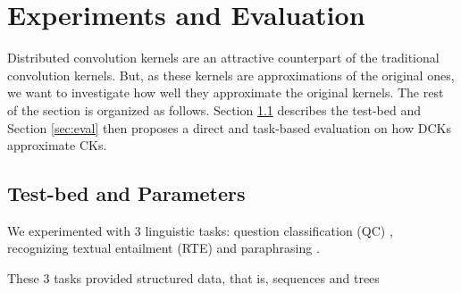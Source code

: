 \documentclass[twoside,11pt]{article}
\def\comment#1#2{}
\begin{document}
\section{Experiments and Evaluation\comment{REVISED}{}}
\label{sec:experiments}


Distributed convolution kernels are an attractive counterpart of the traditional convolution kernels. But, as these kernels are approximations of the original ones, we want to investigate how well they approximate the original kernels. The rest of the section is organized as follows. Section \ref{sec:treecorp} describes the test-bed and Section \ref{sec:eval} then proposes a direct  and task-based evaluation on how DCKs approximate CKs. 




\subsection{Test-bed and Parameters}
\label{sec:treecorp}

We experimented with 3 linguistic tasks: question classification (QC) \cite{Li:2002:LQC:1072228.1072378}, recognizing textual entailment (RTE) \cite{RTE1} and paraphrasing \cite{}. 

These 3 tasks provided structured data, that is, sequences and trees 
\end{document}
